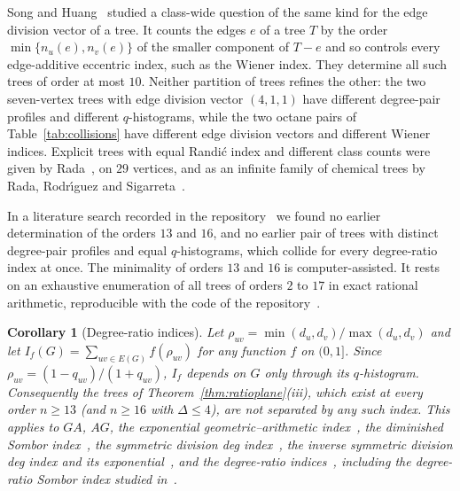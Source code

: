 \documentclass[a5paper, 10pt]{article}
\theoremstyle{plain}
\newtheorem*{corollary}{Corollary}
\theoremstyle{remark}
\theoremstyle{definition}
\begin{document}
  Song and Huang~\cite{SongHuang2023EDV} studied a class-wide question of the same kind for the edge division vector of a tree. It counts the edges $e$ of a tree $T$ by the order $\min\{n_u(e), n_v(e)\}$ of the smaller component of $T - e$ and so controls every edge-additive eccentric index, such as the Wiener index. They determine all such trees of order at most $10$. Neither partition of trees refines the other: the two seven-vertex trees with edge division vector $(4,1,1)$ have different degree-pair profiles and different $q$-histograms, while the two octane pairs of Table~\ref{tab:collisions} have different edge division vectors and different Wiener indices. Explicit trees with equal Randi\'c index and different class counts were given by Rada~\cite[Example~2.6]{Rada2019ExpVDB}, on $29$ vertices, and as an infinite family of chemical trees by Rada, Rodr\'{\i}guez and Sigarreta~\cite[Example~2.1]{RadaRodriguezSigarreta2022Weak}.

  In a literature search recorded in the repository~\cite{LoyolaRepo} we found no earlier determination of the orders $13$ and $16$, and no earlier pair of trees with distinct degree-pair profiles and equal $q$-histograms, which collide for every degree-ratio index at once. The minimality of orders $13$ and $16$ is computer-assisted. It rests on an exhaustive enumeration of all trees of orders $2$ to $17$ in exact rational arithmetic, reproducible with the code of the repository~\cite{LoyolaRepo}.

  \begin{corollary}[Degree-ratio indices]\label{cor:ratioclass}
  Let $\rho_{uv} = \min(d_u,d_v)/\max(d_u,d_v)$ and let
  $I_f(G) = \sum_{uv \in E(G)} f(\rho_{uv})$ for any function
  $f$ on $(0,1]$. Since $\rho_{uv} = (1-q_{uv})/(1+q_{uv})$, $I_f$
  depends on $G$ only through its $q$-histogram. Consequently the trees of Theorem~\ref{thm:ratioplane}(iii), which
  exist at every order $n \ge 13$ (and $n \ge 16$ with $\Delta \le 4$),
  are not separated by any such index. This applies to $GA$, $AG$, the exponential geometric--arithmetic index~\cite{DasMondal2024ExpGA}, the diminished Sombor index~\cite{MovahediGutmanRedzepovicFurtula2026},
  the symmetric division deg index~\cite{VukicevicGasperov2010}, the
  inverse symmetric division deg index and its
  exponential~\cite{DasMondalRazaPal2025ExpISDD}, and the degree-ratio
  indices~\cite{NyauliBuragohain2027DRSO, GutmanBuragohainNyauli2026},
  including the degree-ratio Sombor index studied
  in~\cite{GutmanRedzepovicBuragohainNyauli2027, AliGutmanEtAl2027DRSO, ShaoJahanbani2027}.
  \end{corollary}
\end{document}
